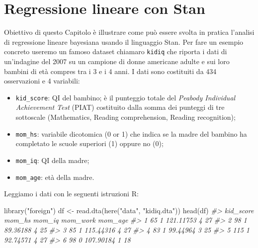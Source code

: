 \documentclass[
]{memoir}
\newenvironment{Shaded}{\begin{snugshade}}{\end{snugshade}}
\newcommand{\CommentTok}[1]{\textcolor[rgb]{0.56,0.35,0.01}{\textit{#1}}}
\newcommand{\FunctionTok}[1]{\textcolor[rgb]{0.00,0.00,0.00}{#1}}
\newcommand{\NormalTok}[1]{#1}
\newcommand{\OtherTok}[1]{\textcolor[rgb]{0.56,0.35,0.01}{#1}}
\newcommand{\StringTok}[1]{\textcolor[rgb]{0.31,0.60,0.02}{#1}}
\providecommand{\tightlist}{%
  \setlength{\itemsep}{0pt}\setlength{\parskip}{0pt}}
\begin{document}
\hypertarget{regressione-lineare-con-stan}{%
\chapter{Regressione lineare con Stan}\label{regressione-lineare-con-stan}}

Obiettivo di questo Capitolo è illustrare come può essere svolta in pratica l'analisi di regressione lineare bayesiana usando il linguaggio Stan. Per fare un esempio concreto useremo un famoso dataset chiamaro \texttt{kidiq} \citep{gelman2020regression} che riporta i dati di un'indagine del 2007 su un campione di donne americane adulte e sui loro bambini di età compres tra i 3 e i 4 anni. I dati sono costituiti da 434 osservazioni e 4 variabili:

\begin{itemize}
\tightlist
\item
  \texttt{kid\_score}: QI del bambino; è il punteggio totale del \emph{Peabody Individual Achievement Test} (PIAT) costituito dalla somma dei punteggi di tre sottoscale (Mathematics, Reading comprehension, Reading recognition);
\item
  \texttt{mom\_hs}: variabile dicotomica (0 or 1) che indica se la madre del bambino ha completato le scuole superiori (1) oppure no (0);
\item
  \texttt{mom\_iq}: QI della madre;
\item
  \texttt{mom\_age}: età della madre.
\end{itemize}

Leggiamo i dati con le seguenti istruzioni R:

\begin{Shaded}
\begin{Highlighting}[]
\FunctionTok{library}\NormalTok{(}\StringTok{"foreign"}\NormalTok{)}
\NormalTok{df }\OtherTok{\textless{}{-}} \FunctionTok{read.dta}\NormalTok{(}\FunctionTok{here}\NormalTok{(}\StringTok{"data"}\NormalTok{, }\StringTok{"kidiq.dta"}\NormalTok{))}
\FunctionTok{head}\NormalTok{(df)}
\CommentTok{\#\textgreater{}   kid\_score mom\_hs    mom\_iq mom\_work mom\_age}
\CommentTok{\#\textgreater{} 1        65      1 121.11753        4      27}
\CommentTok{\#\textgreater{} 2        98      1  89.36188        4      25}
\CommentTok{\#\textgreater{} 3        85      1 115.44316        4      27}
\CommentTok{\#\textgreater{} 4        83      1  99.44964        3      25}
\CommentTok{\#\textgreater{} 5       115      1  92.74571        4      27}
\CommentTok{\#\textgreater{} 6        98      0 107.90184        1      18}
\end{Highlighting}
\end{Shaded}
\end{document}
